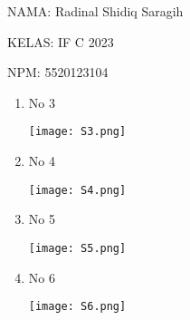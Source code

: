 \documentclass[8pt, a4paper]{article}
\date{}
\newcommand{\lstinputwithcaption}[2]{%
    }
\begin{document}
      NAMA: Radinal Shidiq Saragih

      KELAS: IF C 2023

      NPM: 5520123104

      \begin{enumerate}
        \item No 3

          \begin{multicols}{2}
            \begin{center}
            \lstinputwithcaption{./code/src/soal3/Main.java}{Main.java}
              \texttt{[image: S3.png]}
            \end{center}
          \end{multicols}

        \item No 4

          \begin{multicols}{2}
            \begin{center}
              \lstinputwithcaption{./code/src/soal4/Main.java}{Main.java}
              \texttt{[image: S4.png]}
            \end{center}
          \end{multicols}

        \item No 5

          \begin{multicols}{2}
            \begin{center}

              \lstinputwithcaption{./code/src/soal5/Main.java}{Main.java}

              \columnbreak

              \texttt{[image: S5.png]}

            \end{center}
          \end{multicols}

        \newpage

        \item No 6

          \begin{multicols}{2}
            \begin{center}

              \lstinputwithcaption{./code/src/soal6/Main.java}{Main.java}

              \columnbreak

              \texttt{[image: S6.png]}


\end{center}
\end{multicols}
\end{enumerate}
\end{document}
